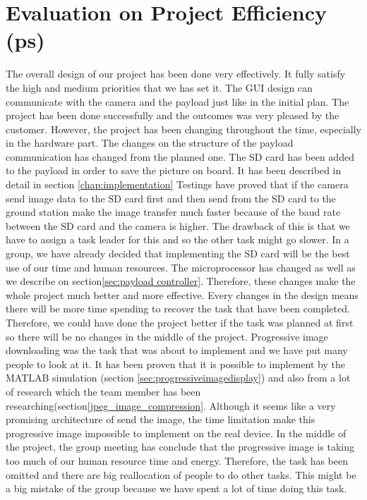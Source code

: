\section{Evaluation on Project Efficiency (ps)}
The overall design of our project has been done very effectively.
It fully satisfy the high and medium priorities that we has set it.
The GUI design can communicate with the camera and the payload just like in the initial plan.
The project has been done successfully and the outcomes was very pleased by the customer.
However, the project has been changing throughout the time, especially in the hardware part.
The changes on the structure of the payload communication has changed from the planned one.
The SD card has been added to the payload in order to save the picture on board.
It has been described in detail in section \ref{chap:implementation}
Testings have proved that if the camera send image data to the SD card first and then send from the SD card to the ground station make the image transfer much faster because of the baud rate between the SD card and the camera is higher.
The drawback of this is that we have to assign a task leader for this and so the other task might go slower.
In a group, we have already decided that implementing the SD card will be the best use of our time and human resources.
The microprocessor has changed as well as we describe on section\ref{sec:payload controller}.
Therefore, these changes make the whole project much better and more effective.
Every changes in the design means there will be more time spending to recover the task that have been completed. 
Therefore, we could have done the project better if the task was planned at first so there will be no changes in the middle of the project.
Progressive image downloading was the task that was about to implement and we have put many people to look at it. 
It has been proven that it is possible to implement by the MATLAB simulation (section \ref{sec:progressiveimagedisplay}) and also from a lot of research which the team member has been researching(section\ref{jpeg_image_compression}.
Although it seems like a very promising architecture of send the image, the time limitation make this progressive image impossible to implement on the real device.
In the middle of the project, the group meeting has conclude that the progressive image is taking too much of our human resource time and energy.
Therefore, the task has been omitted and there are big reallocation of people to do other tasks.
This might be a big mistake of the group because we have spent a lot of time doing this task.


